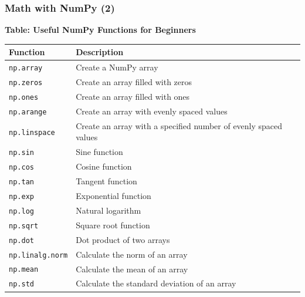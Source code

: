 {\nologo
\begin{frame}[fragile]
  \frametitle{Math with NumPy (2)}
  \textbf{Table: Useful NumPy Functions for Beginners}

  \begin{tabular}{l|l}
  Function & Description \\
  \hline
  \lstinline$np.array$ & Create a NumPy array \\
  \lstinline$np.zeros$ & Create an array filled with zeros \\
  \lstinline$np.ones$ & Create an array filled with ones \\
  \lstinline$np.arange$ & Create an array with evenly spaced values \\
  \lstinline$np.linspace$ & Create an array with a specified number of evenly spaced values \\
  \lstinline$np.sin$ & Sine function \\
  \lstinline$np.cos$ & Cosine function \\
  \lstinline$np.tan$ & Tangent function \\
  \lstinline$np.exp$ & Exponential function \\
  \lstinline$np.log$ & Natural logarithm \\
  \lstinline$np.sqrt$ & Square root function \\
  \lstinline$np.dot$ & Dot product of two arrays \\
  \lstinline$np.linalg.norm$ & Calculate the norm of an array \\
  \lstinline$np.mean$ & Calculate the mean of an array \\
  \lstinline$np.std$ & Calculate the standard deviation of an array \\
  \end{tabular}
\end{frame}
}

